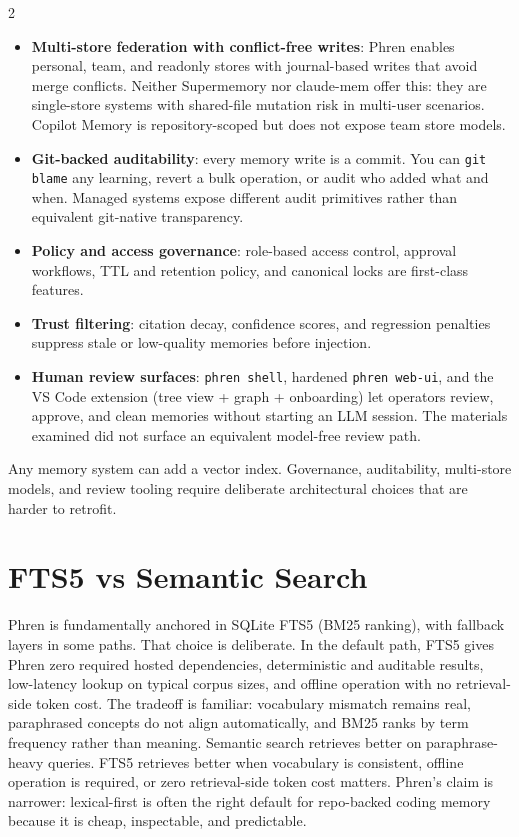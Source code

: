 \documentclass[10pt]{article}
\begin{document}
\begin{multicols}{2}
\raggedright
\begin{itemize}
  \item \textbf{Multi-store federation with conflict-free writes}: Phren enables personal, team, and readonly stores with journal-based writes that avoid merge conflicts. Neither Supermemory nor claude-mem offer this: they are single-store systems with shared-file mutation risk in multi-user scenarios. Copilot Memory is repository-scoped but does not expose team store models.
  \item \textbf{Git-backed auditability}: every memory write is a commit. You can \texttt{git blame} any learning, revert a bulk operation, or audit who added what and when. Managed systems expose different audit primitives rather than equivalent git-native transparency.
  \item \textbf{Policy and access governance}: role-based access control, approval workflows, TTL and retention policy, and canonical locks are first-class features.
  \item \textbf{Trust filtering}: citation decay, confidence scores, and regression penalties suppress stale or low-quality memories before injection.
  \item \textbf{Human review surfaces}: \texttt{phren shell}, hardened \texttt{phren web-ui}, and the VS Code extension (tree view + graph + onboarding) let operators review, approve, and clean memories without starting an LLM session. The materials examined did not surface an equivalent model-free review path.
\end{itemize}

Any memory system can add a vector index. Governance, auditability, multi-store models, and review tooling require deliberate architectural choices that are harder to retrofit.

\pagebreak[2]
\section{FTS5 vs Semantic Search}
\label{sec:fts5}

Phren is fundamentally anchored in SQLite FTS5 (BM25 ranking), with fallback layers in some paths. That choice is deliberate. In the default path, FTS5 gives Phren zero required hosted dependencies, deterministic and auditable results, low-latency lookup on typical corpus sizes, and offline operation with no retrieval-side token cost. The tradeoff is familiar: vocabulary mismatch remains real, paraphrased concepts do not align automatically, and BM25 ranks by term frequency rather than meaning. Semantic search retrieves better on paraphrase-heavy queries. FTS5 retrieves better when vocabulary is consistent, offline operation is required, or zero retrieval-side token cost matters. Phren's claim is narrower: lexical-first is often the right default for repo-backed coding memory because it is cheap, inspectable, and predictable.


\end{multicols}
\end{document}
